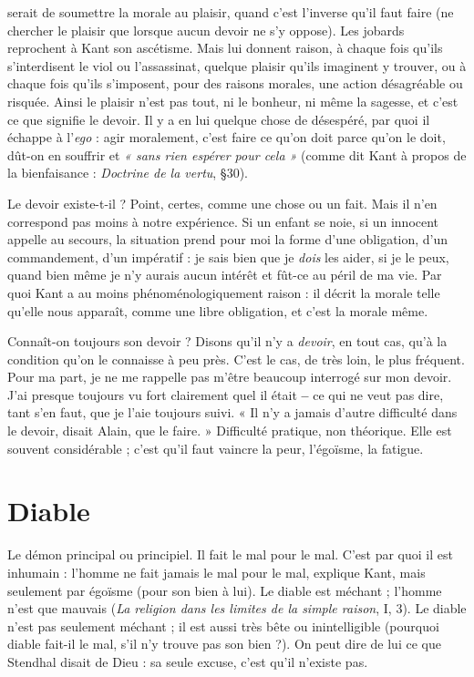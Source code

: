 serait de soumettre la morale au plaisir, quand c’est l'inverse qu’il faut faire (ne
chercher le plaisir que lorsque aucun devoir ne s’y oppose). Les jobards reprochent
à Kant son ascétisme. Mais lui donnent raison, à chaque fois qu'ils
s’interdisent le viol ou l'assassinat, quelque plaisir qu’ils imaginent y trouver,
ou à chaque fois qu’ils s'imposent, pour des raisons morales, une action désagréable
ou risquée. Ainsi le plaisir n’est pas tout, ni le bonheur, ni même la
sagesse, et c’est ce que signifie le devoir. Il y a en lui quelque chose de désespéré,
par quoi il échappe à l’{\it ego} : agir moralement, c’est faire ce qu’on doit parce
qu’on le doit, dût-on en souffrir et {\it « sans rien espérer pour cela »} (comme dit
Kant à propos de la bienfaisance : {\it Doctrine de la vertu}, \S 30).

Le devoir existe-t-il ? Point, certes, comme une chose ou un fait. Mais il
n’en correspond pas moins à notre expérience. Si un enfant se noie, si un innocent
appelle au secours, la situation prend pour moi la forme d’une obligation,
d’un commandement, d’un impératif : je sais bien que je {\it dois} les aider, si je le
peux, quand bien même je n’y aurais aucun intérêt et fût-ce au péril de ma vie.
Par quoi Kant a au moins phénoménologiquement raison : il décrit la morale
telle qu’elle nous apparaît, comme une libre obligation, et c’est la morale
même.

Connaît-on toujours son devoir ? Disons qu’il n’y a {\it devoir}, en tout cas,
qu’à la condition qu’on le connaisse à peu près. C’est le cas, de très loin, le
plus fréquent. Pour ma part, je ne me rappelle pas m'être beaucoup interrogé
sur mon devoir. J'ai presque toujours vu fort clairement quel il était {\bf --} ce qui
ne veut pas dire, tant s’en faut, que je l’aie toujours suivi. « Il n’y a jamais
d’autre difficulté dans le devoir, disait Alain, que le faire. » Difficulté pratique,
non théorique. Elle est souvent considérable ; c’est qu’il faut vaincre la
peur, l’égoïsme, la fatigue.

\section{Diable}
Le démon principal ou principiel. Il fait le mal pour le mal. C’est
par quoi il est inhumain : l’homme ne fait jamais le mal pour le
mal, explique Kant, mais seulement par égoïsme (pour son bien à lui). Le
diable est méchant ; l’homme n’est que mauvais ({\it La religion dans les limites de
la simple raison}, I, 3).
Le diable n’est pas seulement méchant ; il est aussi très bête ou inintelligible
(pourquoi diable fait-il le mal, s’il n’y trouve pas son bien ?). On peut dire de
lui ce que Stendhal disait de Dieu : sa seule excuse, c’est qu’il n’existe pas.

